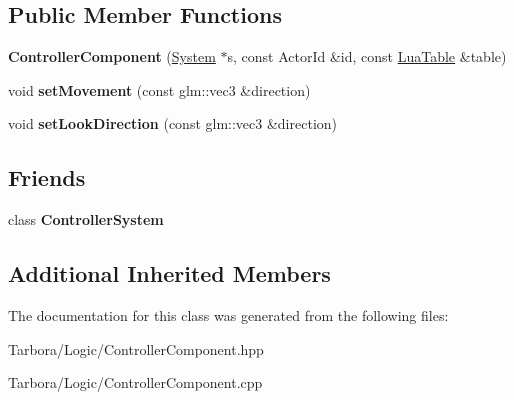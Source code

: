 \subsection*{Public Member Functions}
\begin{DoxyCompactItemize}
\item 
\mbox{\label{classTarbora_1_1ControllerComponent_a87e3acf975ce4c3950b24b0063b12736}} 
{\bfseries Controller\+Component} (\hyperlink{classTarbora_1_1System}{System} $\ast$s, const Actor\+Id \&id, const \hyperlink{classTarbora_1_1LuaTable}{Lua\+Table} \&table)
\item 
\mbox{\label{classTarbora_1_1ControllerComponent_aa344a1b82231c93df1b09ad730928a69}} 
void {\bfseries set\+Movement} (const glm\+::vec3 \&direction)
\item 
\mbox{\label{classTarbora_1_1ControllerComponent_ab05aa76636b3fe81b19d600d67cedb10}} 
void {\bfseries set\+Look\+Direction} (const glm\+::vec3 \&direction)
\end{DoxyCompactItemize}
\subsection*{Friends}
\begin{DoxyCompactItemize}
\item 
\mbox{\label{classTarbora_1_1ControllerComponent_aa3529c8d40124ce67f4463a28e41118c}} 
class {\bfseries Controller\+System}
\end{DoxyCompactItemize}
\subsection*{Additional Inherited Members}


The documentation for this class was generated from the following files\+:\begin{DoxyCompactItemize}
\item 
Tarbora/\+Logic/Controller\+Component.\+hpp\item 
Tarbora/\+Logic/Controller\+Component.\+cpp\end{DoxyCompactItemize}
